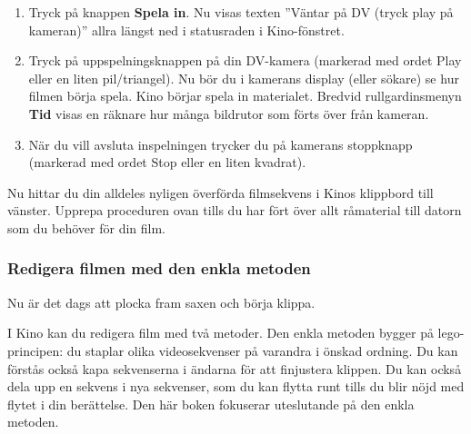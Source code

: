 \documentclass[a4paper,final]{memoir} %
\begin{document}
\begin{enumerate}

\item Tryck på knappen \textbf{Spela in}. Nu visas texten ''Väntar på DV (tryck play på kameran)'' allra längst ned i statusraden i Kino-fönstret.

\item Tryck på uppspelningsknappen på din DV-kamera (markerad med ordet Play eller en liten pil/triangel). Nu bör du i kamerans display (eller sökare) se hur filmen börja spela. Kino börjar spela in materialet. Bredvid rullgardinsmenyn \textbf{Tid} visas en räknare hur många bildrutor som förts över från kameran.

\item När du vill avsluta inspelningen trycker du på kamerans stoppknapp (markerad med ordet Stop eller en liten kvadrat). 

\end{enumerate}

Nu hittar du din alldeles nyligen överförda filmsekvens i Kinos klippbord till vänster. Upprepa proceduren ovan tills du har fört över allt råmaterial till datorn som du behöver för din film. 


\subsubsection{Redigera filmen med den enkla metoden}


Nu är det dags att plocka fram saxen och börja klippa.

I Kino kan du redigera film med två metoder. Den enkla metoden bygger på lego-principen: du staplar olika videosekvenser på varandra i önskad ordning. Du kan förstås också kapa sekvenserna i ändarna för att finjustera klippen. Du kan också dela upp en sekvens i nya sekvenser, som du kan flytta runt tills du blir nöjd med flytet i din berättelse. Den här boken fokuserar uteslutande på den enkla metoden.

\end{document}

